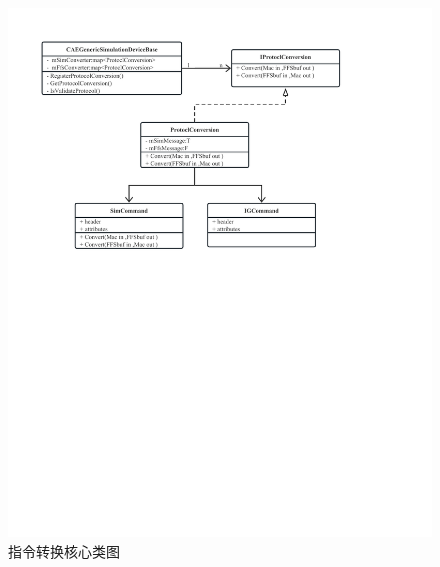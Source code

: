 \begin{figure}[h!]
    \begin{center}
        \includegraphics[width=\textwidth]{pictures/classdiagram2.pdf}
        \caption{指令转换核心类图}
        \label{module22}
    \end{center}
\end{figure}
